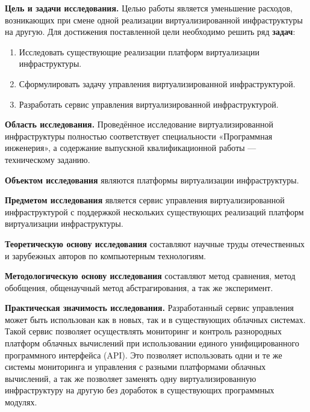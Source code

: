 \textbf{Цель и задачи исследования.}
Целью работы является уменьшение расходов, возникающих при смене одной реализации виртуализированной инфраструктуры на другую.
Для достижения поставленной цели необходимо решить ряд \textbf{задач}:
\begin{enumerate}
\item Исследовать существующие реализации платформ виртуализации инфраструктуры.
\item Сформулировать задачу управления виртуализированной инфраструктурой.
\item Разработать сервис управления виртуализированной инфраструктурой.
\end{enumerate}

\textbf{Область исследования.}
Проведённое исследование виртуализированной инфраструктуры полностью соответствует специальности «Программная инженерия», а содержание выпускной квалификационной работы --- техническому заданию.

\textbf{Объектом исследования} являются платформы виртуализации инфраструктуры.

\textbf{Предметом исследования} является сервис управления виртуализированной инфраструктурой с поддержкой нескольких существующих реализаций платформ виртуализации инфраструктуры.

\textbf{Теоретическую основу исследования} составляют научные труды отечественных и зарубежных авторов по компьютерным технологиям.

\textbf{Методологическую основу исследования} составляют метод сравнения, метод обобщения, общенаучный метод абстрагирования, а так же эксперимент.



\textbf{Практическая значимость исследования.} Разработанный сервис управления может быть использован как в новых, так и в существующих облачных системах.
Такой сервис позволяет осуществлять мониторинг и контроль разнородных платформ облачных вычислений при использовании единого унифицированного программного интерфейса (API).
Это позволяет использовать одни и те же системы мониторинга и управления с разными платформами облачных вычислений, а так же позволяет заменять одну виртуализированную инфраструктуру на другую без доработок в существующих программных модулях.


